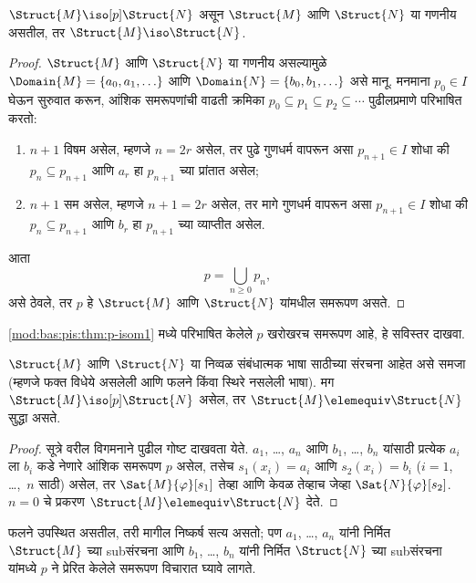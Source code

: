 \begin{thm}\label{mod:bas:pis:thm:p-isom1}
  $\Struct{M} \iso[p] \Struct{N}$ असून $\Struct{M}$ आणि
  $\Struct{N}$ या गणनीय असतील, तर $\Struct{M} \iso
  \Struct{N}$.
\end{thm}

\begin{proof}
  $\Struct{M}$ आणि $\Struct{N}$ या गणनीय असल्यामुळे
  $\Domain{M} = \{a_0, a_1, \ldots \}$ आणि $\Domain{N} = \{b_0, b_1,
  \ldots \}$ असे मानू. मनमाना $p_0 \in I$ घेऊन सुरुवात करून, आंशिक
  समरूपणांची वाढती क्रमिका $p_0 \subseteq p_1 \subseteq p_2
  \subseteq \cdots$ पुढीलप्रमाणे परिभाषित करतो:
  \begin{enumerate}
  \item $n+1$ विषम असेल, म्हणजे $n = 2r$ असेल, तर पुढे गुणधर्म वापरून
    असा $p_{n+1} \in I$ शोधा की $p_n \subseteq p_{n+1}$
    आणि $a_r$ हा $p_{n+1}$ च्या प्रांतात असेल;
  \item $n+1$ सम असेल, म्हणजे $n+1 =2r$ असेल, तर मागे गुणधर्म वापरून
    असा $p_{n+1} \in I$ शोधा की $p_n \subseteq p_{n+1}$
    आणि $b_r$ हा $p_{n+1}$ च्या व्याप्तीत असेल.
  \end{enumerate}
आता
\[p = \bigcup_{n\ge 0} p_n,
\]
असे ठेवले, तर $p$ हे $\Struct{M}$ आणि $\Struct{N}$ यांमधील समरूपण
असते.
\end{proof}

\begin{prob}
  \ref{mod:bas:pis:thm:p-isom1} मध्ये परिभाषित केलेले $p$ खरोखरच
  समरूपण आहे, हे सविस्तर दाखवा.
\end{prob}

\begin{thm}\label{mod:bas:pis:thm:p-isom2}
  $\Struct{M}$ आणि $\Struct{N}$ या निव्वळ संबंधात्मक भाषा
  साठीच्या संरचना आहेत असे समजा (म्हणजे फक्त विधेये
  असलेली आणि फलने किंवा स्थिरे नसलेली भाषा). मग
  $\Struct{M} \iso[p] \Struct{N}$ असेल, तर
  $\Struct{M} \elemequiv \Struct{N}$ सुद्धा असते.
\end{thm}

\begin{proof}
  सूत्रे वरील विगमनाने पुढील गोष्ट दाखवता येते. $a_1$, \dots,
  $a_n$ आणि $b_1$, \dots, $b_n$ यांसाठी प्रत्येक $a_i$ ला $b_i$ कडे
  नेणारे आंशिक समरूपण $p$ असेल, तसेच $s_1(x_i) =a_i$ आणि $s_2(x_i) =b_i$
  ($i =1$, \dots,~$n$ साठी) असेल, तर $\Sat{M}{\varphi}[s_1]$ तेव्हा आणि
  केवळ तेव्हाच जेव्हा $\Sat{N}{\varphi}[s_2]$. $n=0$ चे प्रकरण
  $\Struct{M} \elemequiv \Struct{N}$ देते.
\end{proof}

\begin{rem}
फलने उपस्थित असतील, तरी मागील निष्कर्ष सत्य असतो; पण $a_1$,
\dots, $a_n$ यांनी निर्मित $\Struct{M}$ च्या subसंरचना आणि
$b_1$, \dots, $b_n$ यांनी निर्मित $\Struct{N}$ च्या
subसंरचना यांमध्ये $p$ ने प्रेरित केलेले समरूपण विचारात घ्यावे
लागते.
\end{rem}

